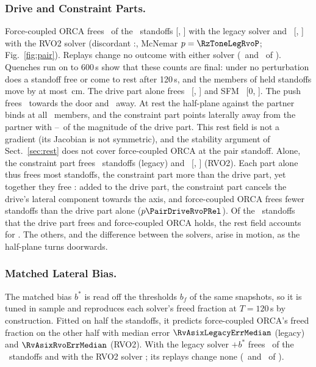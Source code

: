 \subsubsection{Drive and Constraint Parts.}
Force-coupled ORCA frees \RzToneLegacyFreed\ of the \PairN\ standoffs [\RzToneLegacyLo, \RzToneLegacyHi] with the legacy solver and \RzToneRvoFreed\ [\RzToneRvoLo, \RzToneRvoHi] with the RVO2 solver (discordant \RzToneLegRvoA:\RzToneLegRvoB, McNemar $p=\RzToneLegRvoP$; Fig.~\ref{fig:pair}). Replays change no outcome with either solver (\TabThreePairRvoReplayDis\ and \TabThreePairPubReplayDis\ of \TabThreePairOrcaReplays). Quenches run on to 600\,s show that these counts are final: under no perturbation does a standoff free or come to rest after 120\,s, and the members of held standoffs move by at most \RzToneDispMax\,cm. The drive part alone frees \RzToneDriveFreed\ [\RzToneDriveLo, \RzToneDriveHi] and SFM \RzToneSfmFreed\ [0, \RzToneSfmHi]. The push frees \PairFrozenPlusFreed\ towards the door and \PairFrozenMinusFreed\ away. At rest the half-plane against the partner binds at all \RevAelevenPairBinds\ members, and the constraint part points laterally away from the partner with \RevAelevenRatioMin--\RevAelevenRatioMax\ of the magnitude of the drive part. This rest field is not a gradient (its Jacobian is not symmetric), and the stability argument of Sect.~\ref{sec:rest} does not cover force-coupled ORCA at the pair standoff. Alone, the constraint part frees \PairConsPubFreed\ standoffs (legacy) and \RzToneConsFreed\ [\RzToneConsLo, \RzToneConsHi] (RVO2). Each part alone thus frees most standoffs, the constraint part more than the drive part, yet together they free \RzToneRvoFreed: added to the drive part, the constraint part cancels the drive's lateral component towards the axis, and force-coupled ORCA frees fewer standoffs than the drive part alone ($p\PairDriveRvoPRel$). Of the \RevAelevenPairDisc\ standoffs that the drive part frees and force-coupled ORCA holds, the rest field accounts for \RevAelevenPairDiscStatic. The others, and the difference between the solvers, arise in motion, as the half-plane turns doorwards.

\subsubsection{Matched Lateral Bias.}
The matched bias $b^\ast$ is read off the thresholds $b_f$ of the same snapshots, so it is tuned in sample and reproduces each solver's freed fraction at $T=120$\,s by construction. Fitted on half the standoffs, it predicts force-coupled ORCA's freed fraction on the other half with median error $\RvAsixLegacyErrMedian$ (legacy) and $\RvAsixRvoErrMedian$ (RVO2). With the legacy solver $+b^\ast$ frees \PairBsPubFreed\ of the \PairN\ standoffs and with the RVO2 solver \PairBsRvoFreed; its replays change none (\TabThreePairBsPubReplayDis\ and \TabThreePairBsRvoReplayDis\ of \TabThreePairBsReplays).

